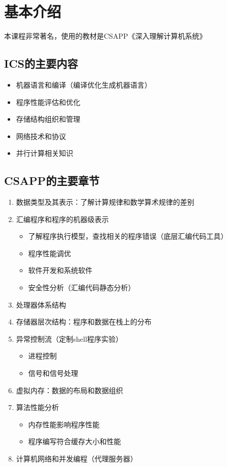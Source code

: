 \section{基本介绍}

本课程非常著名，使用的教材是CSAPP《深入理解计算机系统》

\subsection{ICS的主要内容}
\begin{itemize}
    \item 机器语言和编译（编译优化生成机器语言）
    \item 程序性能评估和优化
    \item 存储结构组织和管理
    \item 网络技术和协议
    \item 并行计算相关知识
\end{itemize}

\subsection{CSAPP的主要章节}
\begin{enumerate}
    \item 数据类型及其表示：了解计算规律和数学算术规律的差别
    \item 汇编程序和程序的机器级表示
    \begin{itemize}
        \item 了解程序执行模型，查找相关的程序错误（底层汇编代码工具）
        \item 程序性能调优
        \item 软件开发和系统软件
        \item 安全性分析（汇编代码静态分析）
    \end{itemize}
    \item 处理器体系结构
    \item 存储器层次结构：程序和数据在栈上的分布
    \item 异常控制流（定制shell程序实验）
    \begin{itemize}
        \item 进程控制
        \item 信号和信号处理
    \end{itemize}
    \item 虚拟内存：数据的布局和数据组织
    \item 算法性能分析
    \begin{itemize}
        \item 内存性能影响程序性能
        \item 程序编写符合缓存大小和性能
    \end{itemize}
    \item 计算机网络和并发编程（代理服务器）
\end{enumerate}

